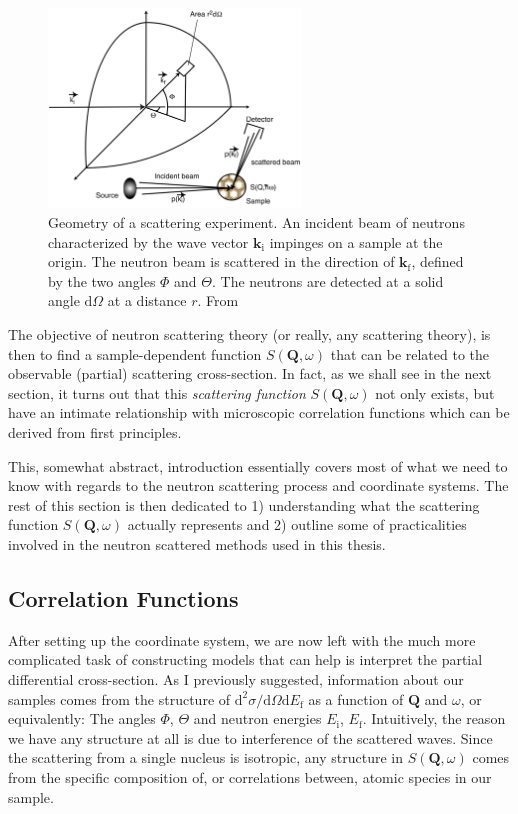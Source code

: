 \begin{figure}
	\centering
	\includegraphics[width=0.6\textwidth]{fig/method/ns/dsdo_schober.png}
	\caption[scattering cross-section geometry]{Geometry of a scattering experiment. An incident beam of neutrons characterized by the wave vector $\bm{k}_\text{i}$ impinges on a sample at the origin. The neutron beam is scattered in the direction of $\bm{k}_\text{f}$, defined by the two angles $\Phi$ and $\Theta$. The neutrons are detected at a solid angle $\mathrm{d}\Omega$ at a distance $r$. From \cite{Schober2014}}
	\label{fig:dsdo_geometry}
\end{figure}

The objective of neutron scattering theory (or really, any scattering theory), is then to find a sample-dependent function $S(\bm{Q}, \omega)$ that can be related to the observable (partial) scattering cross-section. In fact, as we shall see in the next section, it turns out that this \emph{scattering function} $S(\bm{Q}, \omega)$ not only exists, but have an intimate relationship with microscopic correlation functions which can be derived from first principles. 

This, somewhat abstract, introduction essentially covers most of what we need to know with regards to the neutron scattering process and coordinate systems. The rest of this section is then dedicated to 1) understanding what the scattering function $S(\bm{Q}, \omega)$ actually represents and 2) outline some of practicalities involved in the neutron scattered methods used in this thesis. 

\subsection{Correlation Functions}
After setting up the coordinate system, we are now left with the much more complicated task of constructing models that can help is interpret the partial differential cross-section. As I previously suggested, information about our samples comes from the structure of $\mathrm{d}^2 \sigma / \mathrm{d}\Omega \mathrm{d}E_\text{f}$ as a function of $\bm{Q}$ and $\omega$, or equivalently: The angles $\Phi$, $\Theta$ and neutron energies $E_\text{i}$, $E_\text{f}$. Intuitively, the reason we have any structure at all is due to interference of the scattered waves. Since the scattering from a single nucleus is isotropic, any structure in $S(\bm{Q}, \omega)$ comes from the specific composition of, or correlations between, atomic species in our sample. 

